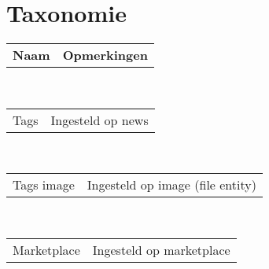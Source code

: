 \section{Taxonomie}\label{taxonomie}

\newcommand{\taxonomie}[2]{
  \begin{tabular}{ p{4cm} p{5cm} }
  #1 & #2
  \end{tabular}
  \\
}

\taxonomie{\textbf{Naam}}{\textbf{Opmerkingen}} 

\taxonomie{Tags}{Ingesteld op news}
\taxonomie{Tags image}{Ingesteld op image (file entity)}
\taxonomie{Marketplace}{Ingesteld op marketplace}
